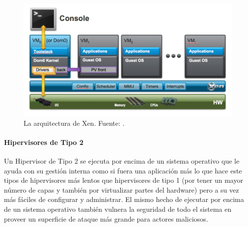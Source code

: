 \begin{figure}
  \begin{center}
      \includegraphics[width=\textwidth]{Figures/arq-xen.png}
  \end{center}
  \caption{La arquitectura de Xen. Fuente: \citep{Xen-Project-Overview}.}
  \label{arq-xen}
\end{figure}

\paragraph{Hipervisores de Tipo 2}
Un Hipervisor de Tipo 2 se ejecuta por encima de un sistema operativo que le ayuda con su gestión interna como si fuera una aplicación más \citep{IBM-Hypervisors} lo que hace este tipos de hipervisores más lentos que hipervisores de tipo 1 (por tener un mayor número de capas y también por virtualizar partes del hardware) pero a su vez más fáciles de configurar y administrar. El mismo hecho de ejecutar por encima de un sistema operativo también vulnera la seguridad de todo el sistema en proveer un superficie de ataque más grande para actores maliciosos.

